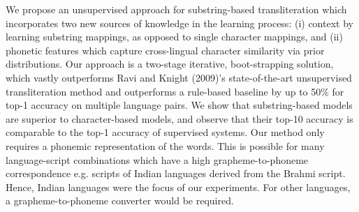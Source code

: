 We propose an unsupervised approach for substring-based transliteration which incorporates two new sources of knowledge in the learning process: (i) context by learning substring mappings, as opposed to single character mappings, and (ii) phonetic features which capture cross-lingual character similarity via prior distributions. Our approach is a two-stage iterative, boot-strapping solution, which vastly outperforms Ravi and Knight (2009)'s state-of-the-art unsupervised transliteration method and outperforms a rule-based baseline by up to 50\% for top-1 accuracy on multiple language pairs. We show that substring-based models are superior to character-based models, and observe that their top-10 accuracy is comparable to the top-1 accuracy of supervised systems. Our method only requires a phonemic representation of the words. This is possible for many language-script combinations which have a high grapheme-to-phoneme correspondence e.g. scripts of Indian languages derived from the Brahmi script. Hence, Indian languages were the focus of our experiments. For other languages, a grapheme-to-phoneme converter would be required.
